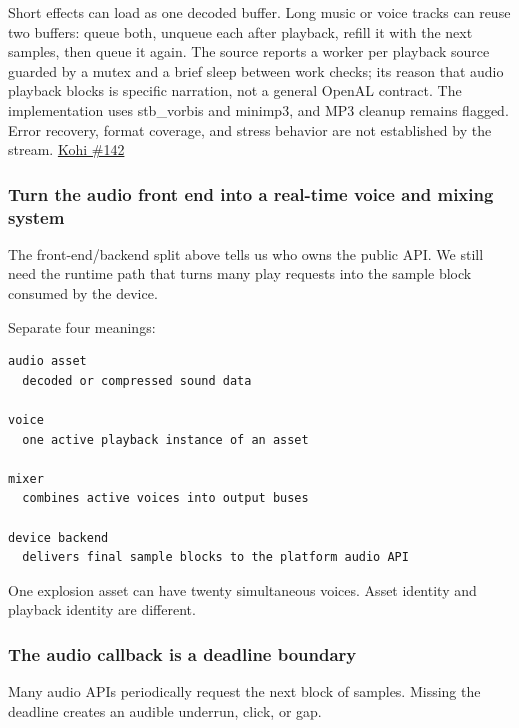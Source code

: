 Short effects can load as one decoded buffer. Long music or voice tracks can reuse two buffers: queue both, unqueue each after playback, refill it with the next samples, then queue it again. The source reports a worker per playback source guarded by a mutex and a brief sleep between work checks; its reason that audio playback blocks is specific narration, not a general OpenAL contract. The implementation uses stb\_vorbis and minimp3, and MP3 cleanup remains flagged. Error recovery, format coverage, and stress behavior are not established by the stream. \href{https://www.youtube.com/watch?v=xb23Y9o7tP4}{Kohi \#142}

\subsubsection{Turn the audio front end into a real-time voice and mixing system}\label{05-engine-i-ch009-turn-the-audio-front-end-into-a-real-time-voice-and-mixing-system}

\hypertarget{05-engine-i-ch009-turn-the-audio-front-end-into-a-real-time-voice-and-mixing-system}{}

The front-end/backend split above tells us who owns the public API. We still need the runtime path that turns many play requests into the sample block consumed by the device.

Separate four meanings:

\begin{verbatim}
audio asset
  decoded or compressed sound data

voice
  one active playback instance of an asset

mixer
  combines active voices into output buses

device backend
  delivers final sample blocks to the platform audio API
\end{verbatim}

One explosion asset can have twenty simultaneous voices. Asset identity and playback identity are different.

\subsubsection{The audio callback is a deadline boundary}\label{05-engine-i-ch009-the-audio-callback-is-a-deadline-boundary}

\hypertarget{05-engine-i-ch009-the-audio-callback-is-a-deadline-boundary}{}

Many audio APIs periodically request the next block of samples. Missing the deadline creates an audible underrun, click, or gap.

